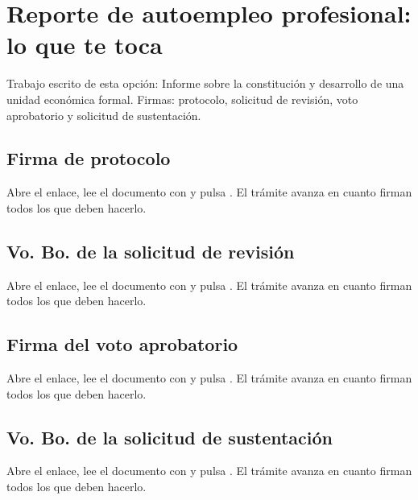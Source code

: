 \section{Reporte de autoempleo profesional: lo que te toca}
Trabajo escrito de esta opción: Informe sobre la constitución y desarrollo de una unidad económica formal. Firmas: protocolo, solicitud de revisión, voto aprobatorio y solicitud de sustentación.
\subsection{Firma de protocolo}
Abre el enlace, lee el documento con  y pulsa . El trámite avanza en cuanto firman todos los que deben hacerlo.
\subsection{Vo. Bo. de la solicitud de revisión}
Abre el enlace, lee el documento con  y pulsa . El trámite avanza en cuanto firman todos los que deben hacerlo.
\subsection{Firma del voto aprobatorio}
Abre el enlace, lee el documento con  y pulsa . El trámite avanza en cuanto firman todos los que deben hacerlo.
\subsection{Vo. Bo. de la solicitud de sustentación}
Abre el enlace, lee el documento con  y pulsa . El trámite avanza en cuanto firman todos los que deben hacerlo.
